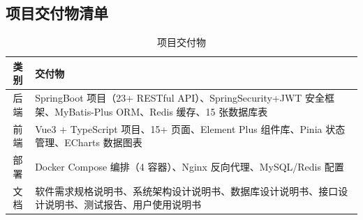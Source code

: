 \documentclass[12pt,a4paper,UTF8]{ctexart}
\begin{document}
\subsection{项目交付物清单}

\begin{table}[H]
\centering
\caption{项目交付物}
\begin{tabularx}{\textwidth}{c X}
\toprule
\textbf{类别} & \textbf{交付物} \\
\midrule
后端 & SpringBoot 项目（23+ RESTful API）、SpringSecurity+JWT 安全框架、MyBatis-Plus ORM、Redis 缓存、15 张数据库表 \\
\hline
前端 & Vue3 + TypeScript 项目、15+ 页面、Element Plus 组件库、Pinia 状态管理、ECharts 数据图表 \\
\hline
部署 & Docker Compose 编排（4 容器）、Nginx 反向代理、MySQL/Redis 配置 \\
\hline
文档 & 软件需求规格说明书、系统架构设计说明书、数据库设计说明书、接口设计说明书、测试报告、用户使用说明书 \\
\bottomrule
\end{tabularx}
\end{table}
\end{document}
